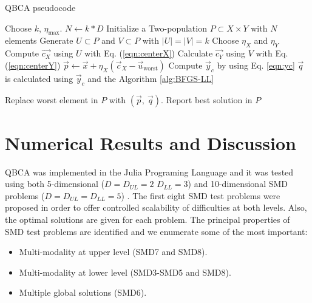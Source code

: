 \documentclass[conference]{IEEEtran}
\theoremstyle{definition}
\begin{document}
\begin{algorithm}[htbp]
    \caption{QBCA pseudocode}
    \label{alg:QBCA}
    \begin{algorithmic}[1]
        \STATE Choose $k$, $\eta_{\max}$.
        \STATE $N \gets k * D$
        \STATE Initialize a Two-population $P\subset X\times Y$ with $N$ elements
                \STATE Generate $U \subset P$ and $V \subset P$ with $|U| = |V| = k$
                \STATE Choose $\eta_{X}$ and $\eta_{Y}$
                \STATE Compute $\vec{c_X}$ using $U$ with Eq. (\ref{eqn:centerX})
                \STATE Calculate $\vec{c_Y}$ using $V$ with Eq. (\ref{eqn:centerY})
                \STATE $ \vec{p} \gets \vec{x} + \eta_{X} (\vec{c}_X - \vec{u}_{\text{worst}})$
                \STATE Compute $ \vec{y}_c $ by using Eq. \ref{eqn:yc}
                \STATE $ \vec{q} $ is calculated using $\vec{y}_c$ and the Algorithm \ref{alg:BFGS-LL}
                
                    \STATE Replace worst element in $P$ with $(\vec{p},\ \vec{q})$.
                \ENDIF
            \ENDFOR
        \ENDWHILE
        \STATE Report best solution in $P$
    \end{algorithmic}
\end{algorithm}

\section{Numerical Results and Discussion} %
\label{sec:numerical_result}

QBCA was implemented in the Julia Programing Language \cite{bezanson2017julia}
and it was tested using both 5-dimensional ($D = D_{UL} = 2 $ $ D_{LL} = 3$) and
10-dimensional SMD problems ($D = D_{UL} = D_{LL} = 5$)
\cite{sinha2014test,sinha2013efficient}. The first eight SMD test problems were
proposed in order to offer controlled scalability of difficulties at both levels.
Also, the optimal solutions are given for each problem. The principal properties
of SMD test problems are identified and we enumerate some of the most important:

\begin{itemize}
    \item Multi-modality at upper level (SMD7 and SMD8).
    \item Multi-modality at lower level (SMD3-SMD5 and SMD8).
    \item Multiple global solutions (SMD6).
\end{itemize}
\end{document}

